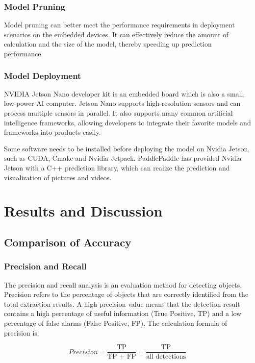 \documentclass[sensors,article,submit,moreauthors,pdftex]{Definitions/mdpi}
\begin{document}
\subsubsection{Model Pruning}
Model pruning can better meet the performance requirements in deployment scenarios on the embedded devices. It can effectively reduce the amount of calculation and the size of the model, thereby speeding up prediction performance.

\subsubsection{Model Deployment}
NVIDIA Jetson Nano developer kit is an embedded board which is also a small, low-power AI computer. Jetson Nano supports high-resolution sensors and can process multiple sensors in parallel. It also supports many common artificial intelligence frameworks, allowing developers to integrate their favorite models and frameworks into products easily.

Some software needs to be installed before deploying the model on Nvidia Jetson, such as CUDA, Cmake and Nvidia Jetpack. PaddlePaddle has provided Nvidia Jetson with a C++ prediction library, which can realize the prediction and visualization of pictures and videos.


\section{Results and Discussion}

\subsection{Comparison of Accuracy}

\subsubsection{Precision and Recall}

The precision and recall analysis is an evaluation method for detecting objects. Precision refers to the percentage of objects that are correctly identified from the total extraction results. A high precision value means that the detection result contains a high percentage of useful information (True Positive, TP) and a low percentage of false alarms (False Positive, FP). The calculation formula of precision is:


\begin{equation} 
Precision = \frac{\text{TP}}{\text{TP + FP} } = \frac{\text{TP}}{\text{all\ detections} }
\end{equation}
\end{document}
